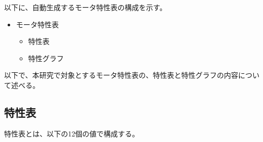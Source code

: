 以下に、自動生成するモータ特性表の構成を示す。
\begin{itemize}
	\item モータ特性表
	\begin{itemize}
		\item 特性表
		\item 特性グラフ
	\end{itemize}
\end{itemize}
以下で、本研究で対象とするモータ特性表の、特性表と特性グラフの内容について述べる。
\subsection{特性表}\label{sub:tokuseihyou}
特性表とは、以下の12個の値で構成する。
